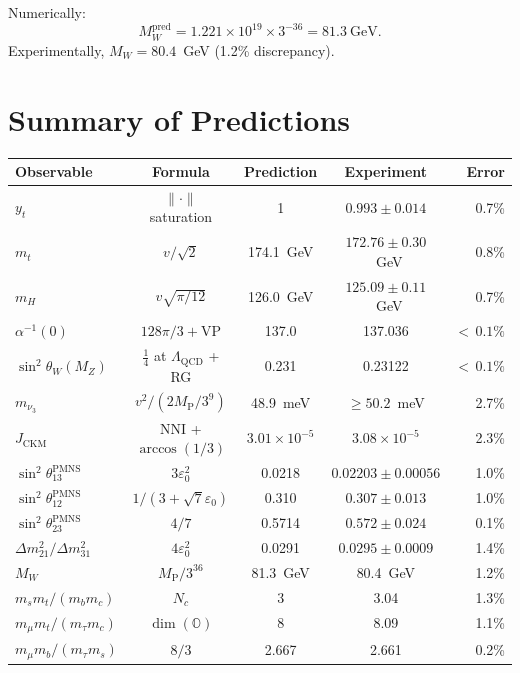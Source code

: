 \documentclass[12pt,a4paper]{article}
\theoremstyle{definition}
\theoremstyle{remark}
\newcommand{\Oct}{\mathbb{O}}
\newcommand{\MP}{M_{\mathrm{P}}}
\newcommand{\MW}{M_W}
\begin{document}
Numerically:
\begin{equation}
\MW^{\text{pred}} = 1.221\times 10^{19} \times 3^{-36} = 81.3~\text{GeV}.
\end{equation}
Experimentally, $\MW = 80.4$~GeV (1.2\% discrepancy).

\section{Summary of Predictions}
\label{sec:summary}

\begin{table}[h]
\centering
\begin{tabular}{@{}lcccr@{}}
\toprule
Observable & Formula & Prediction & Experiment & Error \\
\midrule
$y_t$ & $\|\cdot\|$ saturation & 1 & $0.993\pm0.014$ & 0.7\% \\
$m_t$ & $v/\sqrt{2}$ & 174.1~GeV & $172.76\pm0.30$~GeV & 0.8\% \\
$m_H$ & $v\sqrt{\pi/12}$ & 126.0~GeV & $125.09\pm0.11$~GeV & 0.7\% \\
$\alpha^{-1}(0)$ & $128\pi/3 + \text{VP}$ & 137.0 & 137.036 & ${<}\,0.1\%$ \\
$\sin^2\theta_W(M_Z)$ & $\frac{1}{4}$ at $\Lambda_{\text{QCD}}$ + RG & 0.231 & 0.23122 & ${<}\,0.1\%$ \\
$m_{\nu_3}$ & $v^2/(2\MP/3^9)$ & 48.9~meV & $\geq 50.2$~meV & 2.7\% \\
$J_{\text{CKM}}$ & NNI + $\arccos(1/3)$ & $3.01\times 10^{-5}$ & $3.08\times 10^{-5}$ & 2.3\% \\
$\sin^2\theta_{13}^{\text{PMNS}}$ & $3\varepsilon_0^2$ & 0.0218 & $0.02203\pm0.00056$ & 1.0\% \\
$\sin^2\theta_{12}^{\text{PMNS}}$ & $1/(3{+}\sqrt{7}\varepsilon_0)$ & 0.310 & $0.307\pm0.013$ & 1.0\% \\
$\sin^2\theta_{23}^{\text{PMNS}}$ & $4/7$ & 0.5714 & $0.572\pm0.024$ & 0.1\% \\
$\Delta m^2_{21}/\Delta m^2_{31}$ & $4\varepsilon_0^2$ & 0.0291 & $0.0295\pm0.0009$ & 1.4\% \\
$\MW$ & $\MP/3^{36}$ & 81.3~GeV & 80.4~GeV & 1.2\% \\
$m_s m_t/(m_b m_c)$ & $N_c$ & 3 & 3.04 & 1.3\% \\
$m_\mu m_t/(m_\tau m_c)$ & $\dim(\Oct)$ & 8 & 8.09 & 1.1\% \\
$m_\mu m_b/(m_\tau m_s)$ & $8/3$ & 2.667 & 2.661 & 0.2\% \\

\end{tabular}
\end{table}
\end{document}
